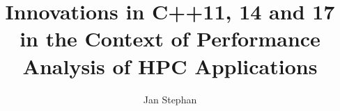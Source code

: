 \documentclass[utf8,hauptseminar]{zihpub}
\author{Jan Stephan}
\title{Innovations in C++11, 14 and 17 in the Context of Performance Analysis of HPC Applications}
\begin{document}



%




{}

\end{document}
